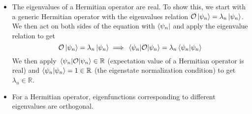 \documentclass[11pt, a4paper]{article}
\newcommand{\Herm}{Hermitian\xspace}
\renewcommand{\O}{\mathcal{O}}  %
\newcommand{\p}{\psi}  %
\begin{document}
\begin{itemize}
	\item The eigenvalues of a \Herm operator are real. To show this, we start with a generic \Herm operator with the eigenvalues relation $  \O \ket{\psi_{n}} = \lambda_{n} \ket{\psi_{n}} $. We then act on both sides of the equation with $ \bra{\p_{n}} $ and apply the eigenvalue relation to get
	\begin{equation*}
		\O \ket{\p_{n}} = \lambda_{n} \ket{\p_{n}} \implies \mel{\p_{n}}{\O}{\p_{n}} = \lambda_{n} \braket{\p_{n}}{\p_{n}}
	\end{equation*}
	We then apply $ \mel{\p_{n}}{\O}{\p_{n}} \in \mathbb{R} $ (expectation value of a \Herm operator is real) and $ \braket{\p_{n}}{\p_{n}} = 1 \in \mathbb{R} $ (the eigenstate normalization condition) to get $ \lambda_{n} \in \mathbb{R} $. 
	
	\item For a \Herm operator, eigenfunctions corresponding to different eigenvalues are orthogonal. 

\end{itemize}
\end{document}
